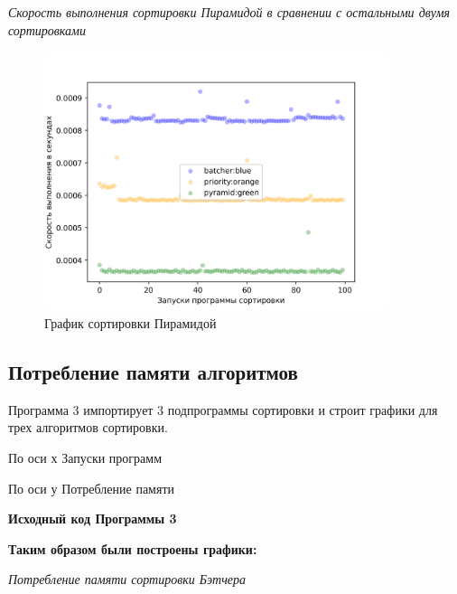 \textit{Скорость выполнения сортировки Пирамидой в сравнении с остальными двумя сортировками}

\begin{figure}[H]
    \centering
    \includegraphics[width=0.9\textwidth]{./plots/bitonic_speed.png}
    \caption{График сортировки Пирамидой}
\end{figure}








\subsection{Потребление памяти алгоритмов}






Программа 3 импортирует 3 подпрограммы сортировки и строит графики для трех алгоритмов сортировки.

По оси х Запуски программ

По оси у Потребление памяти

\textbf{Исходный код Программы 3}




\newpage
\textbf{Таким образом были построены графики:}

\textit{Потребление памяти сортировки Бэтчера}

